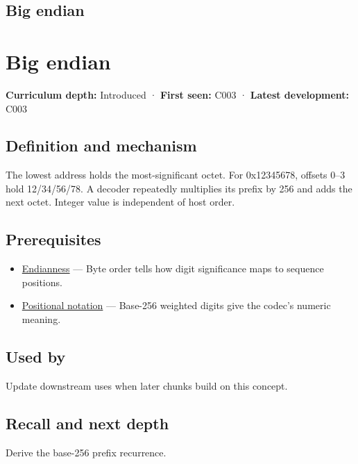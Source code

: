 \hypertarget{appendix-92e040df969a}{}
\section*{Big endian}
\chapter{Big endian}\label{appendix-92e040df969a-big-endian}

\textbf{Curriculum depth:} Introduced · \textbf{First seen:} C003 · \textbf{Latest development:} C003

\section{Definition and mechanism}\label{appendix-92e040df969a-definition-and-mechanism}

The lowest address holds the most-significant octet. For 0x12345678, offsets 0--3 hold 12/34/56/78. A decoder repeatedly multiplies its prefix by 256 and adds the next octet. Integer value is independent of host order.

\section{Prerequisites}\label{appendix-92e040df969a-prerequisites}

\begin{itemize}
\tightlist
\item
  \hyperref[appendix-bc07c3d25b18]{Endianness} --- Byte order tells how digit significance maps to sequence positions.
\item
  \hyperref[appendix-83c3f28f7bda]{Positional notation} --- Base-256 weighted digits give the codec's numeric meaning.
\end{itemize}

\section{Used by}\label{appendix-92e040df969a-used-by}

Update downstream uses when later chunks build on this concept.

\section{Recall and next depth}\label{appendix-92e040df969a-recall-and-next-depth}

Derive the base-256 prefix recurrence.

